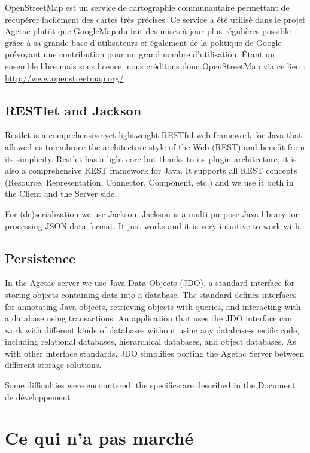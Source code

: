\documentclass{article}
\begin{document}
OpenStreetMap est un service de cartographie communautaire permettant 
de récupérer facilement des cartes très précises. Ce service a été utilisé 
dans le projet Agetac plutôt que GoogleMap du fait des mises à jour plus régulières 
possible grâce à sa grande base d'utilisateurs et également de la politique 
de Google prévoyant une contribution pour un grand nombre d'utilisation. Étant 
un ensemble libre mais sous licence, nous créditons donc OpenStreetMap via ce 
lien :  \url{http://www.openstreetmap.org/}

\subsection{RESTlet and Jackson}

Restlet is a comprehensive yet lightweight RESTful web framework 
for Java that allowed us to embrace the architecture style of the Web (REST) and 
benefit from its simplicity. Restlet has a light core but thanks to its plugin 
architecture, it is also a comprehensive REST framework for Java. It supports all 
REST concepts (Resource, Representation, Connector, Component, etc.) and we use 
it both in the Client and the Server side.

For (de)serialization we use Jackson. Jackson is a multi-purpose 
Java library for processing JSON data format. It just 
works and it is very intuitive to work with.

\subsection{Persistence}

In the Agetac server we use Java Data Objects (JDO), a standard 
interface for storing objects containing data into a database. The standard defines 
interfaces for annotating Java objects, retrieving objects with queries, and interacting 
with a database using transactions. An application that uses the JDO interface 
can work with different kinds of databases without using any database-specific 
code, including relational databases, hierarchical databases, and object databases. 
As with other interface standards, JDO simplifies porting the Agetac Server between 
different storage solutions.

Some difficulties were encountered, the specifics are described 
in the Document de développement


\section{Ce qui n'a pas marché}
\end{document}
